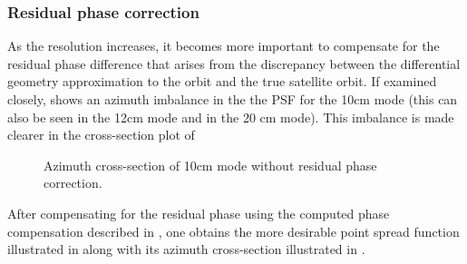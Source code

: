 \subsubsection{Residual phase correction}
As the resolution increases, it becomes more important to compensate for the residual phase difference that arises from the discrepancy between the differential geometry approximation to the orbit and the true satellite orbit. If examined closely,  shows an azimuth imbalance in the the PSF for the 10cm mode (this can also be seen in the 12cm mode and in the 20 cm mode). This imbalance is made clearer in the cross-section plot of 
\begin{figure}[ht!]
\begin{center}
 \caption{Azimuth cross-section of 10cm mode without residual phase correction.}
 \label{fg:azimuthCross10Unbalanced}
 \end{center}
\end{figure}
After compensating for the residual phase using the computed phase compensation described in , one obtains the more desirable point spread function illustrated in  along with its azimuth cross-section illustrated in .
